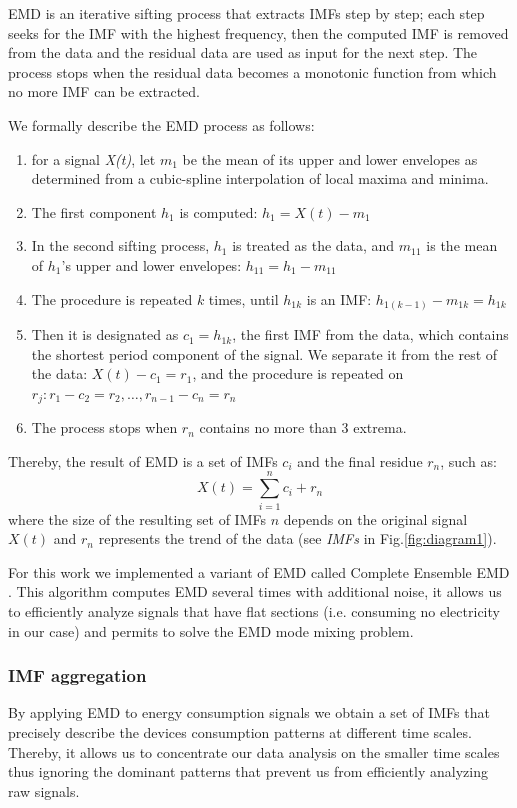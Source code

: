 EMD is an iterative sifting process that extracts IMFs step by step; each step seeks for the IMF with the highest frequency, then the computed IMF is removed from the data and the residual data are used as input for the next step.
The process stops when the residual data becomes a monotonic function from which no more IMF can be extracted.

We formally describe the EMD process as follows: 
\begin{enumerate}
\item for a signal \emph{X(t)}, let $m_1$ be the mean of its upper and lower envelopes as determined from a cubic-spline interpolation of local maxima and minima.
\item The first component $h_1$ is computed: $h_1=X(t)-m_1$
\item In the second sifting process, $h_1$ is treated as the data, and $m_{11}$ is the mean of $h_1$'s upper and lower envelopes: $h_{11}=h_1-m_{11}$
\item The procedure is repeated $k$ times, until $h_{1k}$ is an IMF: $h_{1(k-1)}-m_{1k}=h_{1k}$
\item Then it is designated as $c_1=h_{1k}$, the first IMF from the data, which contains the shortest period component of the signal. We separate it from the rest of the data: $X(t)-c_1 = r_1$, and the procedure is
repeated on $r_j: r_1-c_2 = r_2,\dots,r_{n-1} - c_n = r_n$
\item The process stops when $r_n$ contains no more than 3 extrema.
\end{enumerate}

Thereby, the result of EMD is a set of IMFs $c_i$ and the final residue $r_n$, such as: \[X(t)=\sum^{n}_{i=1}c_i+r_n\]
where the size of the resulting set of IMFs $n$ depends on the original signal $X(t)$ and $r_n$ represents the trend of the data (see \emph{IMFs} in Fig.\ref{fig:diagram1}).

For this work we implemented a variant of EMD called Complete Ensemble EMD \cite{torres:icassp2012}.
This algorithm computes EMD several times with additional noise, it allows us to efficiently analyze signals that have flat sections (i.e. consuming no electricity in our case) and permits to solve the EMD mode mixing problem.

\subsubsection{IMF aggregation} \label{methodo:corr}
By applying EMD to energy consumption signals we obtain a set of IMFs that precisely describe the devices consumption patterns at different time scales.
Thereby, it allows us to concentrate our data analysis on the smaller time scales thus ignoring the dominant patterns that prevent us from efficiently analyzing raw signals.

